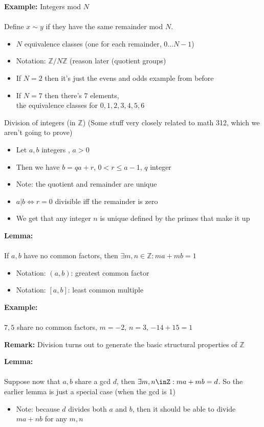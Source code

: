\documentclass{article}
\newcommand{\Z}{\mathbb{Z}}
\begin{document}
\begin{example} 
\textbf{Example:} Integers mod $N$ \\
~\\
Define $x \sim y$ if they have the same remainder mod $N$.
\begin{itemize}
	\item $N$ equivalence classes (one for each remainder, $0\ldots N-1$)
	\item Notation: $\Z /N\Z$ (reason later (quotient groups)
	\item If $N=2$ then it's just the evens and odds example from before
	\item If $N=7$ then there's $7$ elements, \\
		the equivalence classes for $0,1,2,3,4,5,6$
\end{itemize}
\end{example}
Division of integers (in $\Z$) (Some stuff very closely related to math 312, which we aren't going to prove)
\begin{itemize}
	\item Let $a,b$ integers , $a>0$
	\item Then we have $b= qa+r$, $0 <r\le a-1$, $q$ integer
	\item Note: the quotient and remainder are unique
	\item $a|b \iff r=0$ divisible iff the remainder is zero 
	\item We get that any integer $n$ is unique defined by the primes that make it up
\end{itemize}
\begin{lemma} 
\textbf{Lemma:} \\
~\\
If $a,b$ have no common factors, then $\exists m,n \in\Z : ma+mb=1$
\begin{itemize}
	\item Notation: $(a,b)$: greatest common factor
	\item Notation: $\left[a,b\right]$: least common multiple
\end{itemize}
\end{lemma}
\begin{example} 
\textbf{Example:}  \\
~\\
$7,5$ share no common factors, $m=-2$, $n=3$, $-14 + 15 = 1$
\end{example}
\begin{remark} 
\textbf{Remark:}  Division turns out to generate the basic structural properties of $\Z$
\end{remark}
\begin{lemma} 
\textbf{Lemma:} \\
~\\
Suppose now that $a,b$ share a gcd $d$, then $\exists m,n\inZ: ma+mb=d$. So the earlier lemma is just a special case (when the gcd is 1)
\begin{itemize}
	\item Note: because $d$ divides both $a$ and $b$, then it should be able to divide $ma+nb$ for any $m,n$
\end{itemize}
\end{lemma}
\end{document}
